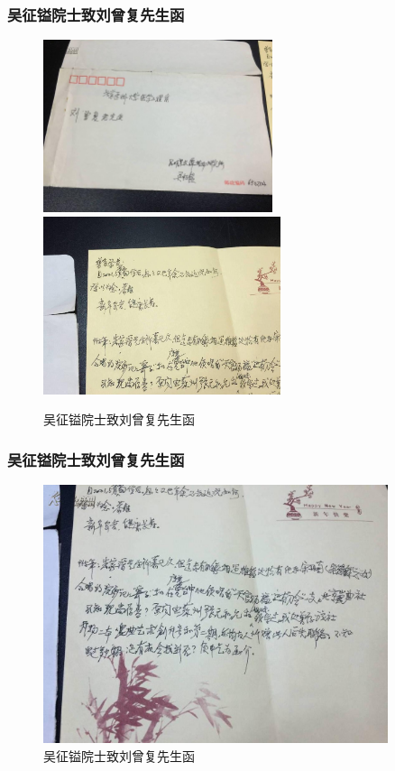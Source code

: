 \documentclass[cjk,slidestop,compress,mathserif,blue]{beamer}
\begin{document}
\frame
{
	\frametitle{吴征镒院士致刘曾复先生函}
\begin{figure}[h!]
\centering
\vspace{-0.2in}
\includegraphics[height=0.40\textwidth,width=0.60\textwidth,viewport=100 100 1080 660,clip]{Figures/Wu_to_Liu_Letter-1.jpg}\\
\includegraphics[height=0.33\textwidth,width=0.62\textwidth,viewport=210 200 1100 650,clip]{Figures/Wu_to_Liu_Letter-2.jpg}
\caption{吴征镒院士致刘曾复先生函}
\label{Wu_to_Liu-1}
\end{figure}
}

\frame
{
	\frametitle{吴征镒院士致刘曾复先生函}
\begin{figure}[h!]
\centering
\vspace{-0.2in}
\includegraphics[height=0.62\textwidth,width=0.9\textwidth,viewport=90 210 1050 850,clip]{Figures/Wu_to_Liu_Letter-3.jpg}
\caption{吴征镒院士致刘曾复先生函}
\label{Wu_to_Liu-2}
\end{figure}
}
\end{document}
